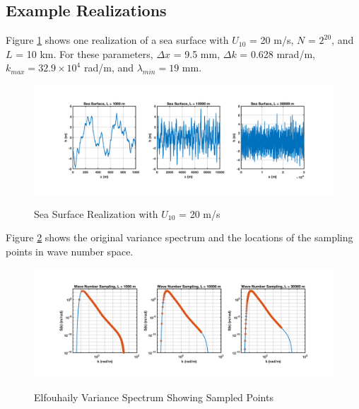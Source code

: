 \subsection{Example Realizations}
Figure \ref{os_fig:7} shows one realization of a sea surface with $U_{10}$ = 20 m/s, $N$ = $2^{20}$, and $L$ = 10 km. For these parameters, $\Delta x$ = 9.5 mm, $\Delta k$ = 0.628 mrad/m, $k_{max} = 32.9\times 10^4$ rad/m, and $\lambda_{min} = 19$ mm.
\begin{figure}[H]
  \begin{center}
\includegraphics[width=6in]{../media/Ocean_Surface/sea_surface_test.png}
  \end{center}
  \renewcommand{\baselinestretch}{1} \small\normalsize
  \begin{quote}
    \caption[Sea Surface Realization with $U_{10}$ = 20 m/s]{Sea Surface Realization with $U_{10}$ = 20 m/s\label{os_fig:7}}
  \end{quote}
\end{figure}
\renewcommand{\baselinestretch}{2} \small\normalsize

Figure \ref{os_fig:8} shows the original variance spectrum and the locations of the sampling points in wave number space.
\begin{figure}[H]
  \begin{center}
\includegraphics[width=6in]{../media/Ocean_Surface/sampling_test.png}
  \end{center}
  \renewcommand{\baselinestretch}{1} \small\normalsize
  \begin{quote}
    \caption[Elfouhaily Variance Spectrum Showing Sampled Points]{Elfouhaily Variance Spectrum Showing Sampled Points\label{os_fig:8}}
  \end{quote}
\end{figure}
\renewcommand{\baselinestretch}{2} \small\normalsize

